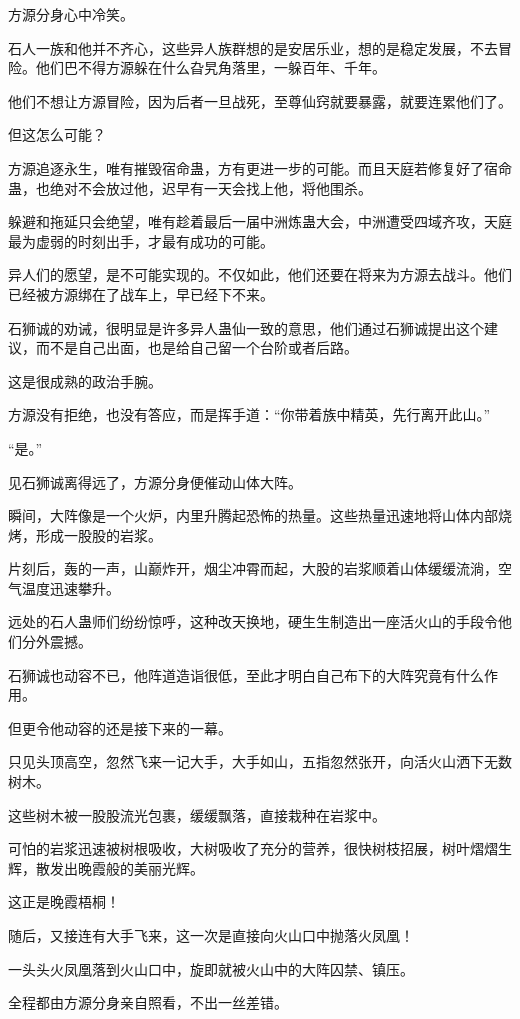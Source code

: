 \begin{this_body}
方源分身心中冷笑。

石人一族和他并不齐心，这些异人族群想的是安居乐业，想的是稳定发展，不去冒险。他们巴不得方源躲在什么旮旯角落里，一躲百年、千年。

他们不想让方源冒险，因为后者一旦战死，至尊仙窍就要暴露，就要连累他们了。

但这怎么可能？

方源追逐永生，唯有摧毁宿命蛊，方有更进一步的可能。而且天庭若修复好了宿命蛊，也绝对不会放过他，迟早有一天会找上他，将他围杀。

躲避和拖延只会绝望，唯有趁着最后一届中洲炼蛊大会，中洲遭受四域齐攻，天庭最为虚弱的时刻出手，才最有成功的可能。

异人们的愿望，是不可能实现的。不仅如此，他们还要在将来为方源去战斗。他们已经被方源绑在了战车上，早已经下不来。

石狮诚的劝诫，很明显是许多异人蛊仙一致的意思，他们通过石狮诚提出这个建议，而不是自己出面，也是给自己留一个台阶或者后路。

这是很成熟的政治手腕。

方源没有拒绝，也没有答应，而是挥手道：“你带着族中精英，先行离开此山。”

“是。”

见石狮诚离得远了，方源分身便催动山体大阵。

瞬间，大阵像是一个火炉，内里升腾起恐怖的热量。这些热量迅速地将山体内部烧烤，形成一股股的岩浆。

片刻后，轰的一声，山巅炸开，烟尘冲霄而起，大股的岩浆顺着山体缓缓流淌，空气温度迅速攀升。

远处的石人蛊师们纷纷惊呼，这种改天换地，硬生生制造出一座活火山的手段令他们分外震撼。

石狮诚也动容不已，他阵道造诣很低，至此才明白自己布下的大阵究竟有什么作用。

但更令他动容的还是接下来的一幕。

只见头顶高空，忽然飞来一记大手，大手如山，五指忽然张开，向活火山洒下无数树木。

这些树木被一股股流光包裹，缓缓飘落，直接栽种在岩浆中。

可怕的岩浆迅速被树根吸收，大树吸收了充分的营养，很快树枝招展，树叶熠熠生辉，散发出晚霞般的美丽光辉。

这正是晚霞梧桐！

随后，又接连有大手飞来，这一次是直接向火山口中抛落火凤凰！

一头头火凤凰落到火山口中，旋即就被火山中的大阵囚禁、镇压。

全程都由方源分身亲自照看，不出一丝差错。


\end{this_body}
